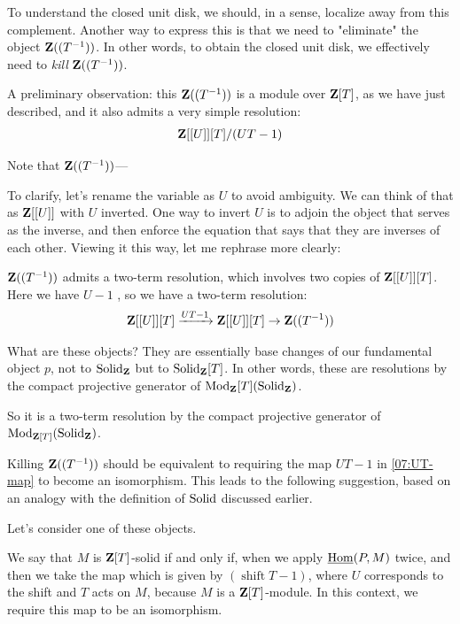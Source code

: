 To understand the closed unit disk, we should, in a sense, localize away from this complement. Another way to express this is that we need to "eliminate" the object $\mathbf Z((T^{-1}))$. In other words, to obtain the closed unit disk, we effectively need to \emph{kill} $\mathbf Z((T^{-1}))$.

A preliminary observation: this $\mathbf Z((T^{-1}))$ is a module over $\mathbf Z[T]$, as we have just described, and it also admits a very simple resolution:
\begin{align*}
\mathbf Z[[U]][T] / (UT - 1)
\end{align*}

Note that $\mathbf Z((T^{-1}))$---

To clarify, let's rename the variable as $U$ to avoid ambiguity. We can think of that  as $\mathbf Z[[U]]$ with $U$ inverted. One way to invert $U$ is to adjoin the object that serves as the inverse, and then enforce the equation that says that they are inverses of each other. Viewing it this way, let me rephrase more clearly:

$\mathbf Z((T^{-1}))$ admits a two-term resolution, which involves two copies of $\mathbf Z[[U]][T]$. Here we have $U-1$ , so we have a two-term resolution:
\begin{align*} \label{07:UT-map}
\mathbf Z[[U]][T] \xrightarrow{UT-1} \mathbf Z[[U]][T] \rightarrow \mathbf Z((T^{-1}))
\end{align*}

What are these objects? They are essentially base changes of our fundamental object $p$, not to $\mathrm{Solid}_{\mathbf Z}$ but to $\mathrm{Solid}_\mathbf Z[T]$. In other words, these are resolutions by the compact projective generator of $\operatorname{Mod}_\mathbf Z[T](\mathrm{Solid}_\mathbf Z)$.

So it is a two-term resolution by the compact projective generator of $\operatorname{Mod}_{\mathbf Z[T]}(\mathrm{Solid}_\mathbf Z)$.

Killing $\mathbf Z((T^{-1}))$ should be equivalent to requiring the map $UT-1$ in \ref{07:UT-map} to become an isomorphism.
This leads to the following suggestion, based on an analogy with the definition of $\mathrm{Solid}$ discussed earlier.

Let's consider one of these objects. 

We say that $M$ is $\mathbf Z[T]$-solid if and only if, when we apply $\operatorname{\underline{Hom}}(P, M)$ twice, and then we take the map which is given by $(\operatorname{shift}T - 1)$, where $U$ corresponds to the shift and $T$ acts on $M$, because $M$ is a $\mathbf Z[T]$-module. In this context, we require this map to be an isomorphism.

